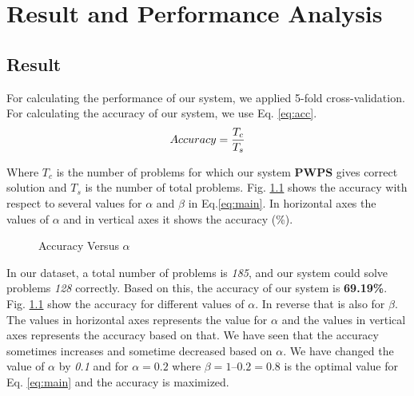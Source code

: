 \documentclass[document.tex]{subfiles}
\begin{document}
\chapter{Result and Performance Analysis}

\section{Result}
\noindent For calculating the performance of our system, we applied 5-fold cross-validation. For calculating the accuracy of our system, we use Eq. \ref{eq:acc}.
\begin{equation}
	Accuracy = {T_c \over T_s}
	\label{eq:acc}
\end{equation}

Where $T_c$ is the number of problems for which our system
\textbf{PWPS} gives correct solution and $T_s$ is the number of total problems. Fig. \ref{fig:accvsalpha} shows the accuracy with respect to several values for $\alpha$ and $\beta$ in Eq.\ref{eq:main}. In horizontal axes the values of $\alpha$ and
in vertical axes it shows the accuracy (\%).
\begin{figure}[H]
	\begin{center}
	\end{center}
	\caption{Accuracy Versus $\alpha$}
	\label{fig:accvsalpha}
\end{figure}

In our dataset, a total number of problems is \textit{185}, and our system could solve problems \textit{128} correctly. Based on this, the accuracy of our system is \textbf{69.19\%}. Fig. \ref{fig:accvsalpha} show the accuracy for different values of $\alpha$. In reverse that is also for $\beta$. The values in horizontal axes represents the value for $\alpha$ and the values in vertical axes represents the accuracy based on that. We have seen that the accuracy sometimes increases and sometime decreased based on $\alpha$. We have changed the value of $\alpha$ by \textit{0.1} and for $\alpha=0.2$ where $\beta = 1 – 0.2 = 0.8$ is the optimal value for Eq. \ref{eq:main} and the accuracy is maximized.
\end{document}
